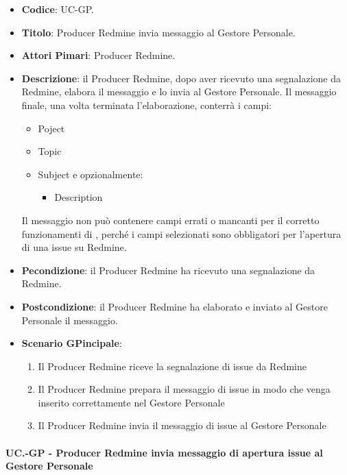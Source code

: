 	\begin{itemize}
		\item \textbf{Codice}: UC\theuccount-GP.
		\item \textbf{Titolo}: Producer Redmine invia messaggio al Gestore Personale.
		\item \textbf{Attori Pimari}: Producer Redmine.
		\item \textbf{Descrizione}: il Producer Redmine, dopo aver ricevuto una
		 segnalazione da Redmine, elabora il messaggio e lo invia al Gestore Personale.
		 Il messaggio finale, una volta terminata l'elaborazione, conterrà i campi:
		 \begin{itemize}
		 	\item Poject
		 	\item Topic
		 	\item Subject e opzionalmente:
		 	\begin{itemize}
		 		\item Description
		 	\end{itemize}
		 \end{itemize}
	 	Il messaggio non può contenere campi errati o mancanti per il corretto funzionamenti di \progetto, perché i campi selezionati sono obbligatori per l'apertura di una issue su Redmine.
		\item \textbf{Pecondizione}: il Producer Redmine ha ricevuto una segnalazione da Redmine.
		\item \textbf{Postcondizione}: il Producer Redmine ha elaborato e inviato al Gestore Personale il messaggio.
		\item \textbf{Scenario GPincipale}: 
		\begin{enumerate}
			\item Il Producer Redmine riceve la segnalazione di issue da Redmine
			\item Il Producer Redmine prepara il messaggio di issue in modo che venga inserito correttamente nel Gestore Personale
			\item Il Producer Redmine invia il messaggio di issue al Gestore Personale
		\end{enumerate}
		
	\end{itemize}
	
	\paragraph{UC\theuccount.\thesubuccount-GP - Producer Redmine invia messaggio di apertura issue al Gestore Personale}
	
